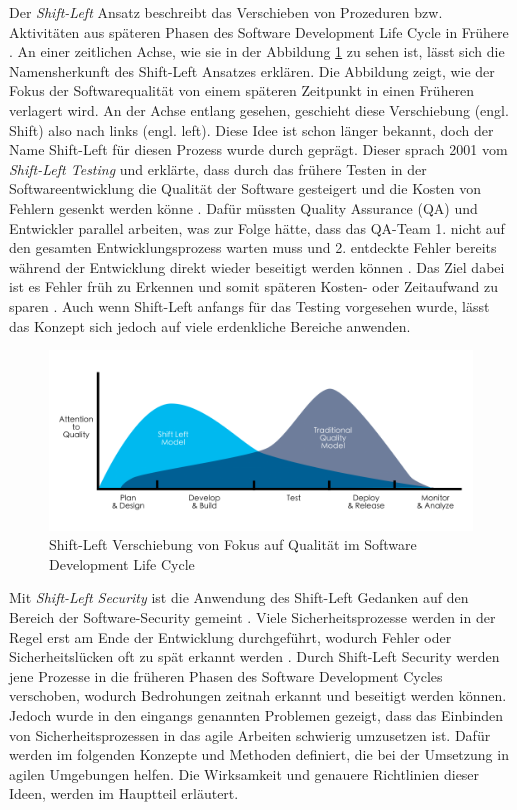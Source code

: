 Der \textit{Shift-Left} Ansatz beschreibt das Verschieben von Prozeduren bzw. Aktivitäten aus späteren Phasen des Software Development Life Cycle in Frühere \cite{andriadi_impact_2023}. An einer zeitlichen Achse, wie sie in der Abbildung \ref{fig:shiftleft} zu sehen ist, lässt sich die Namensherkunft des Shift-Left Ansatzes erklären. Die Abbildung zeigt, wie der Fokus der Softwarequalität von einem späteren Zeitpunkt in einen Früheren verlagert wird. An der Achse entlang gesehen, geschieht diese Verschiebung (engl. Shift) also nach links (engl. left). Diese Idee ist schon länger bekannt, doch der Name Shift-Left für diesen Prozess wurde durch \citet{smith_shift-left_2001} geprägt. Dieser sprach 2001 vom \textit{Shift-Left Testing} und erklärte, dass durch das frühere Testen in der Softwareentwicklung die Qualität der Software gesteigert und die Kosten von Fehlern gesenkt werden könne \cite{dawoud_better_2024}. Dafür müssten Quality Assurance (QA) und Entwickler parallel arbeiten, was zur Folge hätte, dass das QA-Team 1. nicht auf den gesamten Entwicklungsprozess warten muss und 2. entdeckte Fehler bereits während der Entwicklung direkt wieder beseitigt werden können \cite{andriadi_impact_2023}. Das Ziel dabei ist es Fehler früh zu Erkennen und somit späteren Kosten- oder Zeitaufwand zu sparen \cite{dawoud_better_2024}. Auch wenn Shift-Left anfangs für das Testing vorgesehen wurde, lässt das Konzept sich jedoch auf viele erdenkliche Bereiche anwenden.

\begin{figure}
    \centering
    \includegraphics[width=0.9\linewidth]{images/Shift_Left.png}
    \caption{Shift-Left Verschiebung von Fokus auf Qualität im Software Development Life Cycle}
    \label{fig:shiftleft}
\end{figure}

Mit \textit{Shift-Left Security} ist die Anwendung des Shift-Left Gedanken auf den Bereich der Software-Security gemeint \cite{dawoud_better_2024}. Viele Sicherheitsprozesse werden in der Regel erst am Ende der Entwicklung durchgeführt, wodurch Fehler oder Sicherheitslücken oft zu spät erkannt werden \cite{dawoud_better_2024}. Durch Shift-Left Security werden jene Prozesse in die früheren Phasen des Software Development Cycles verschoben, wodurch Bedrohungen zeitnah erkannt und beseitigt werden können. Jedoch wurde in den eingangs genannten Problemen gezeigt, dass das Einbinden von Sicherheitsprozessen in das agile Arbeiten schwierig umzusetzen ist. Dafür werden im folgenden Konzepte und Methoden definiert, die bei der Umsetzung in agilen Umgebungen helfen. Die Wirksamkeit und genauere Richtlinien dieser Ideen, werden im Hauptteil erläutert.

